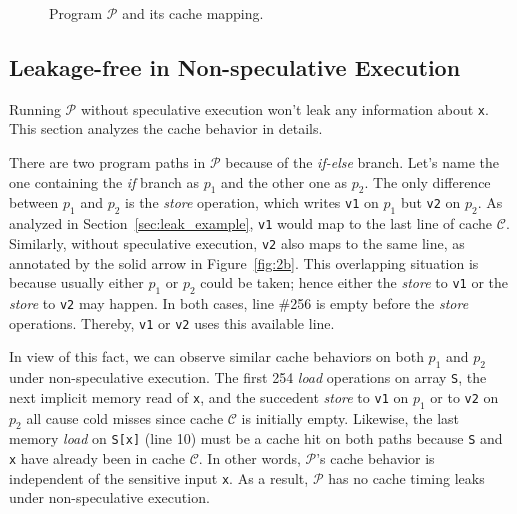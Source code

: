 \documentclass[sigconf]{acmart}
\newcommand{\prog}{\mathcal{P}}
\begin{document}
\begin{figure}
{\begin{minipage}{0.3\linewidth}
\end{minipage}
}
\vspace{-3ex}
\caption{Program $\mathcal{P}$ and its cache mapping.}
\label{fig:motiv}
\end{figure}


\subsection{Leakage-free in Non-speculative Execution}
\label{sec:normal_exec}

Running $\prog$ without speculative execution won't leak any information 
about \texttt{x}. This section analyzes the cache behavior in details. 


There are two program paths in $\prog$ because of the \textit{if-else} 
branch. Let's name the one containing the \textit{if} branch as $p_1$ 
and the other one as $p_2$. The only difference between $p_1$ and $p_2$
is the \emph{store} operation, which writes \texttt{v1} on $p_1$ but 
\texttt{v2} on $p_2$. As analyzed in Section~\ref{sec:leak_example}, 
\texttt{v1} would map to the last line of cache $\mathcal{C}$. Similarly, 
without speculative execution, \texttt{v2} also maps to the same line, as 
annotated by the solid arrow in Figure~\ref{fig:2b}. This overlapping 
situation is because usually either $p_1$ or $p_2$ could be taken; 
hence either the \textit{store} to \texttt{v1} or the \textit{store} 
to \texttt{v2} may happen. In both cases, line \#256 is empty before 
the \textit{store} operations. Thereby, \texttt{v1} or \texttt{v2} 
uses this available line.


In view of this fact, we can observe similar cache behaviors on both $p_1$ 
and $p_2$ under non-speculative execution. The first 254 \emph{load} 
operations on array \texttt{S}, the next implicit memory read of \texttt{x},
and the succedent \textit{store} to \texttt{v1} on $p_1$ or to \texttt{v2} 
on $p_2$ all cause cold misses since cache $\mathcal{C}$ is initially empty. 
Likewise, the last memory \emph{load} on \texttt{S[x]} (line 10) must be a 
cache hit on both paths because \texttt{S} and \texttt{x} have already been 
in cache $\mathcal{C}$. In other words, $\prog$'s cache behavior is 
independent of the sensitive input \texttt{x}. As a result, $\prog$ has no 
cache timing leaks under non-speculative execution.
\end{document}
